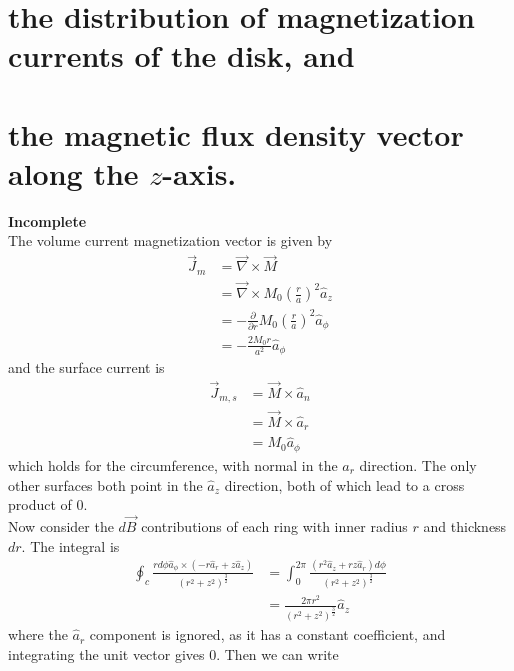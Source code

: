\documentclass[answers]{exam}
\begin{document}
\begin{questions}
\begin{parts}
    \part{the distribution of magnetization currents of the disk, and}
    \part{the magnetic flux density vector along the $z$-axis.}
\end{parts}

\begin{solution}
    \textbf{Incomplete} \\
    The volume current magnetization vector is given by
    \begin{align*}
        \vec J_m &= \vec\nabla \times \vec M \\
                 &= \vec\nabla \times M_0\left(\frac{r}{a}\right)^2 \hat a_z \\
                 &= -\frac{\partial}{\partial r} M_0\left(\frac{r}{a}\right)^2 \hat a_\phi \\
                 &= -\frac{2M_0r}{a^2} \hat a_\phi
    \end{align*}
    and the surface current is
    \begin{align*}
        \vec J_{m,s} &= \vec M \times \hat a_n \\
                     &= \vec M \times \hat a_r \\
                     &= M_0 \hat a_\phi
    \end{align*}
    which holds for the circumference, with normal in the $\hat a_r$ direction. The only other surfaces both point in the $\hat a_z$ direction, both of which lead to a cross product of 0. \\
    Now consider the $d\vec B$ contributions of each ring with inner radius $r$ and thickness $dr$. The integral is
    \begin{align*}
        \oint_c \frac{rd\phi\hat a_\phi \times (-r\hat a_r + z\hat a_z)}{(r^2+z^2)^{\frac{3}{2}}} &= \int_0^{2\pi} \frac{(r^2\hat a_z + rz\hat a_r)d\phi}{(r^2+z^2)^{\frac{3}{2}}} \\
                                                                                                  &= \frac{2\pi r^2}{(r^2+z^2)^{\frac{3}{2}}}\hat a_z
    \end{align*}
    where the $\hat a_r$ component is ignored, as it has a constant coefficient, and integrating the unit vector gives 0. Then we can write

\end{solution}
\end{questions}
\end{document}
